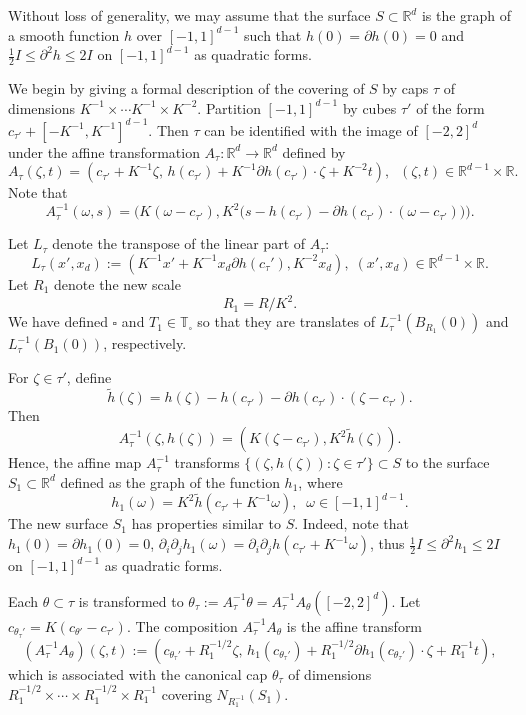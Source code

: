 \documentclass[11pt]{amsart}
\theoremstyle{definition}
\theoremstyle{remark}
\numberwithin{equation}{section}
\newcommand{\R}{\mathbb{R}}
\newcommand{\T}{\mathbb{T}}
\newcommand{\sq}{\square}
\begin{document}
Without loss of generality, we may assume that the surface $S\subset \R^d$ is the graph of a smooth function $h$ over $[-1,1]^{d-1}$ such that $h(0)=\partial h(0) = 0$ and $
\frac{1}{2} I \leq \partial^2 h \leq 2I$ on $[-1,1]^{d-1}$ as quadratic forms. 

We begin by giving a formal description of the covering of $S$ by caps $\tau$ of dimensions  $K^{-1}\times \cdots K^{-1} \times K^{-2}$. Partition $[-1,1]^{d-1}$ by cubes $\tau'$ of the form $c_{\tau'} + [-K^{-1},K^{-1}]^{d-1}$. Then $\tau$ can be identified with the image of $[-2,2]^d$ under the affine transformation $A_\tau  : \R^d \to \R^d$ defined  by
\[  A_{\tau} (\zeta, t)  = (c_{\tau'}+ K^{-1} \zeta, \, h(c_{\tau'})+ K^{-1} \partial h(c_{\tau'}) \cdot \zeta + K^{-2} t ),  \;\; (\zeta,t)\in \R^{d-1}\times \R.\] 
Note that 
\[ A_{\tau}^{-1} (\omega, s) = \Big( K(\omega-c_{\tau'}) , K^2 \big( s-h(c_{\tau'})-\partial h(c_{\tau'})\cdot(\omega - c_{\tau'}) \big) \Big). \]

Let $L_{\tau}$ denote the transpose of the linear part of $A_\tau$: 
\[ L_{\tau} (x',x_d):= (K^{-1} x'+K^{-1}x_d \partial h(c_\tau'), K^{-2}x_d ), \; (x',x_d) \in \R^{d-1}\times \R. \]
Let $R_1$ denote the new scale 
\[ R_1= R/K^2. \] 
We have defined $\sq$ and $T_1 \in \T_\sq$ so that they are translates of  $L_\tau^{-1}(B_{R_1}(0))$  and $L_\tau^{-1}(B_{1}(0))$, respectively. 


For $\zeta \in \tau'$, define  
\[ \tilde{h}(\zeta) =  h(\zeta) - h(c_{\tau'}) - \partial h(c_{\tau'})\cdot (\zeta-c_{\tau'}). \]
Then 
\[ A_\tau^{-1}(\zeta, h(\zeta)) = (K(\zeta- c_{\tau'}), K^2\tilde{h}(\zeta) ). \]
Hence, the affine map $A_{\tau}^{-1}$ transforms $\{ (\zeta, h(\zeta)): \zeta \in \tau' \} \subset S$ to the surface $S_1\subset \R^d$ defined as the graph of the function $h_1$, where 
\[ h_1(\omega) =K^2  \tilde{h}(c_{\tau'} + K^{-1} \omega), \;\; \omega  \in [-1,1]^{d-1}. \]
The new surface $S_1$ has properties similar to $S$. Indeed, note that $h_1(0)=\partial h_1(0) = 0$, $\partial_{i} \partial_{j} h_1(\omega)=\partial_{i} \partial_{j}  h(c_{\tau'} + K^{-1} \omega )$, thus $\frac{1}{2} I\leq \partial^2 h_1 \leq 2I$ on $[-1,1]^{d-1}$ as quadratic forms. 

Each $\theta \subset \tau$ is transformed to $\theta_\tau := A_\tau^{-1} \theta = A_\tau^{-1} A_\theta ([-2,2]^d)$.  Let $c_{\theta_\tau'} = K(c_{\theta'}-c_{\tau'})$.
The composition $A_\tau^{-1} A_\theta$ is the affine transform 
\[  (A_\tau^{-1} A_\theta) (\zeta,t) := (c_{\theta_\tau'} + R_1^{-1/2} \zeta, \, h_1(c_{\theta_\tau'} ) + R_1^{-1/2} \partial h_1(c_{\theta_\tau'}) \cdot \zeta + R_1^{-1}t ), \]
which is associated with the canonical cap $\theta_\tau$ of dimensions $R_1^{-1/2}\times \cdots \times R_1^{-1/2} \times R_1^{-1}$ covering $N_{R_1^{-1}}(S_1)$.
\end{document}

